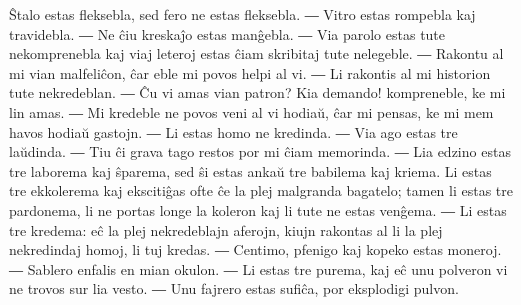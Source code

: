 Ŝtalo estas fleksebla, sed fero ne estas fleksebla. ― Vitro estas rompebla kaj travidebla. ― Ne ĉiu kreskaĵo estas manĝebla. ― Via parolo estas tute nekomprenebla kaj viaj leteroj estas ĉiam skribitaj tute nelegeble. ― Rakontu al mi vian malfeliĉon, ĉar eble mi povos helpi al vi. ― Li rakontis al mi historion tute nekredeblan. ― Ĉu vi amas vian patron? Kia demando! kompreneble, ke mi lin amas. ― Mi kredeble ne povos veni al vi hodiaŭ, ĉar mi pensas, ke mi mem havos hodiaŭ gastojn. ― Li estas homo ne kredinda. ― Via ago estas tre laŭdinda. ― Tiu ĉi grava tago restos por mi ĉiam memorinda. ― Lia edzino estas tre laborema kaj ŝparema, sed ŝi estas ankaŭ tre babilema kaj kriema. Li estas tre ekkolerema kaj ekscitiĝas ofte ĉe la plej malgranda bagatelo; tamen li estas tre pardonema, li ne portas longe la koleron kaj li tute ne estas venĝema. ― Li estas tre kredema: eĉ la plej nekredeblajn aferojn, kiujn rakontas al li la plej nekredindaj homoj, li tuj kredas. ― Centimo, pfenigo kaj kopeko estas moneroj. ― Sablero enfalis en mian okulon. ― Li estas tre purema, kaj eĉ unu polveron vi ne trovos sur lia vesto. ― Unu fajrero estas sufiĉa, por eksplodigi pulvon.

